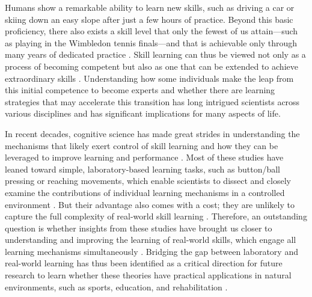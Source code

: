 
Humans show a remarkable ability to learn new skills, such as driving a car or skiing down an easy slope after just a few hours of practice. Beyond this basic proficiency, there also exists a skill level that only the fewest of us attain—such as playing in the Wimbledon tennis finals—and that is achievable only through many years of dedicated practice \cite{hodges_predicting_2004, ericsson_role_1993, vaeyens_talent_2009}. Skill learning can thus be viewed not only as a process of becoming competent but also as one that can be extended to achieve extraordinary skills \cite{ericsson_development_2003, ericsson_scientific_1998}. Understanding how some individuals make the leap from this initial competence to become experts and whether there are learning strategies that may accelerate this transition has long intrigued scientists across various disciplines \cite{ericsson_expert_1994, ericsson_scientific_1998, ericsson_development_2003, ericsson_prospects_2002} and has significant implications for many aspects of life.

In recent decades, cognitive science has made great strides in understanding the mechanisms that likely exert control of skill learning and how they can be leveraged to improve learning and performance \cite{wolpert_principles_2011, makino_circuit_2016, spampinato_multiple_2021, krakauer_motor_2019, haith_model-based_2013, huang_rethinking_2011, shmuelof_are_2011, doya_complementary_2000}. Most of these studies have leaned toward simple, laboratory-based learning tasks\cite{krakauer_motor_2019, du_relationship_2022}, such as button/ball pressing \cite{hardwick_time-dependent_2019, vassiliadis_reward_2021} or reaching movements\cite{shadmehr_adaptive_1994, krakauer_learning_2000},  which enable scientists to dissect and closely examine the contributions of individual learning mechanisms in a controlled environment \cite{spampinato_multiple_2021}. But their advantage also comes with a cost; they are unlikely to capture the full complexity of real-world skill learning \cite{krakauer_motor_2019, mangalam_investigating_2023, du_relationship_2022, chen_effects_2018, wolpert_principles_2011, gallivan_decision-making_2018, iyer_probing_2020, ingram_naturalistic_2011}. Therefore, an outstanding question is whether insights from these studies have brought us closer to understanding and improving the learning of real-world skills, which engage all learning mechanisms simultaneously \cite{spampinato_multiple_2021}. Bridging the gap between laboratory and real-world learning has thus been identified as a critical direction for future research to learn whether these theories have practical applications in natural environments, such as sports, education, and rehabilitation \cite{du_relationship_2022, wolpert_motor_2010, yarrow_inside_2009, haar_motor_2020, ingram_naturalistic_2011}.

